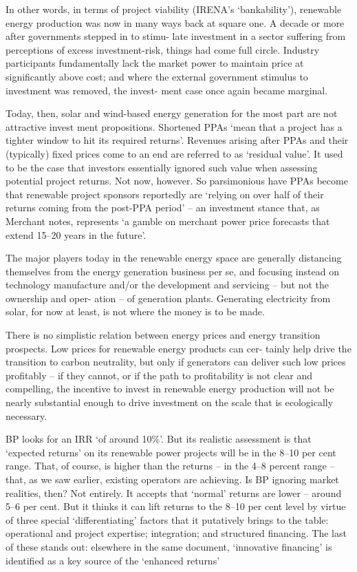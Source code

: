 \documentclass[
]{book}
\begin{document}
In other words, in terms of project viability (IRENA's `bankability'), renewable energy production
was now in many ways back at square one. A decade or more after governments stepped in to stimu-
late investment in a sector suﬀering from perceptions of excess investment-risk, things had come full
circle. Industry participants fundamentally lack the market power to maintain price at signiﬁcantly
above cost; and where the external government stimulus to investment was removed, the invest-
ment case once again became marginal.

Today, then, solar and wind-based energy generation for the most part
are not attractive invest ment propositions.
Shortened PPAs `mean that a project has a tighter
window to hit its required returns'.
Revenues arising after PPAs and their (typically) ﬁxed prices come
to an end are referred to as `residual value'.
It used to be the case that investors essentially ignored
such value when assessing potential project returns.
Not now, however. So
parsimonious have PPAs become that renewable project sponsors reportedly are `relying on over
half of their returns coming from the post-PPA period' -- an investment stance that, as Merchant
notes, represents `a gamble on merchant power price forecasts that extend 15--20 years in the
future'.

The major players today in the renewable energy space are
generally distancing themselves from the energy generation business per se, and focusing instead on
technology manufacture and/or the development and servicing -- but not the ownership and oper-
ation -- of generation plants.
Generating electricity from solar, for now at
least, is not where the money is to be made.

There is no simplistic relation between
energy prices and energy transition prospects. Low prices for renewable energy products can cer-
tainly help drive the transition to carbon neutrality, but only if generators can deliver such low
prices proﬁtably -- if they cannot, or if the path to proﬁtability is not clear and compelling, the
incentive to invest in renewable energy production will not be nearly substantial enough to drive
investment on the scale that is ecologically necessary.

BP looks for an IRR `of around 10\%'.
But its
realistic assessment is that `expected returns' on its renewable power projects will be in the 8--10 per
cent range.
That, of course, is higher than the returns -- in the 4--8 percent range --
that, as we saw earlier, existing operators are achieving. Is BP ignoring market realities, then? Not
entirely. It accepts that `normal' returns are lower -- around 5--6 per cent. But it thinks it can lift
returns to the 8--10 per cent level by virtue of three special `diﬀerentiating' factors that it putatively
brings to the table: operational and project expertise; integration; and structured ﬁnancing. The last
of these stands out: elsewhere in the same document, `innovative ﬁnancing' is identiﬁed as a key
source of the `enhanced returns'
\end{document}
